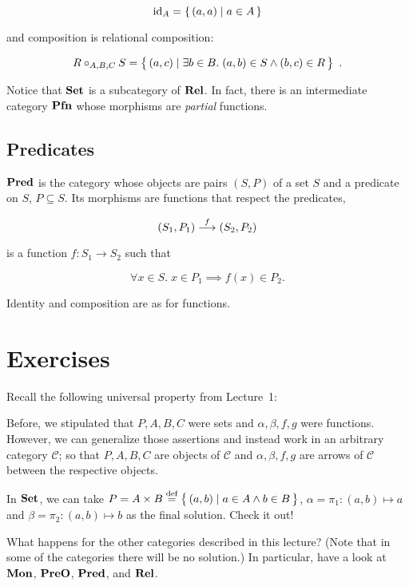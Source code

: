 \[\mathrm{id}_{ A } = \{ \, (a, a) \;|\; a \in A \, \}\]

and composition is relational composition:

\[
  R \circ_{A,B,C} S
  =
  \big\{ \,
    (a, c) \;|\; \exists b \in B.\; (a, b) \in S \wedge (b, c) \in R
  \, \big\}
\enspace.
\]

Notice that $\mathbf {Set}$ is a subcategory of $\mathbf {Rel}$. In fact, there is an
intermediate category $\mathbf {Pfn}$ whose morphisms are \emph{partial} functions.

\subsection{Predicates}

$\mathbf {Pred}$ is the category whose objects are pairs $(S, P)$ of a set $S$ and a
predicate on $S$, $P \subseteq S$. Its morphisms are functions that respect
the predicates, \ie

\[(S_1, P_1) \overset{f}{\longrightarrow} (S_2, P_2)\]

is a function $f : S_1 \rightarrow S_2$ such that

\[\forall x \in S.\; x \in P_1 \implies f(x) \in P_2 .\]

Identity and composition are as for functions.

\section{Exercises}

Recall the following universal property from Lecture~1:

\begin{center}
\end{center}

Before, we stipulated that $P, A, B, C$ were sets and $\alpha, \beta, f, g$
were functions. However, we can generalize those assertions and instead work
in an arbitrary category $\mathcal C$; so that $P, A, B, C$ are objects of
$\mathcal C$ and $\alpha, \beta, f, g$ are arrows of $\mathcal C$ between the
respective objects.

\begin{exercise}
  In $\mathbf {Set}$, we can take
  $P = A \times B\stackrel{\text{def}}{=} \big\{ \, (a,b) \mid a\in A \wedge b\in B \, \big\}$,
  $\alpha = \pi_1: (a,b)\mapsto a$ and $\beta = \pi_2: (a,b)\mapsto b$ as the
  final solution.  Check it out!

  What happens for the other categories described in this lecture? (Note that in
  some of the categories there will be no solution.) In particular, have a look
  at $\mathbf {Mon}$, $\mathbf {PreO}$, $\mathbf {Pred}$, and $\mathbf {Rel}$.
\end{exercise}

